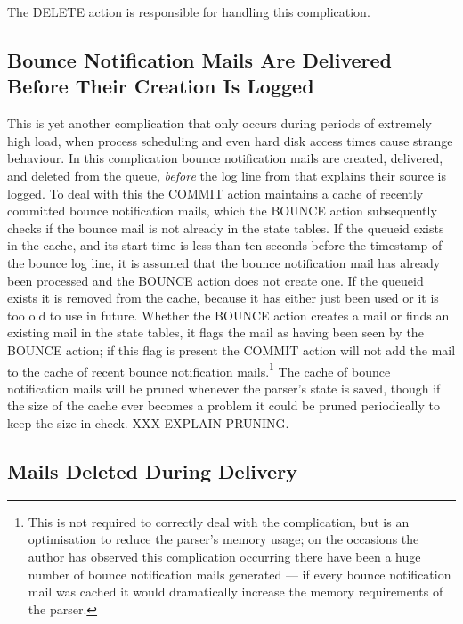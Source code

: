 The DELETE action is responsible for handling this complication.

\subsection{Bounce Notification Mails Are Delivered Before Their Creation
Is Logged}

\label{Bounce notification mails delivered before their creation is logged}

This is yet another complication that only occurs during periods of
extremely high load, when process scheduling and even hard disk access
times cause strange behaviour.  In this complication bounce notification
mails are created, delivered, and deleted from the queue, \textit{before\/}
the log line from  that explains their source is logged.  To
deal with this the COMMIT action maintains a cache of recently committed
bounce notification mails, which the BOUNCE action subsequently checks if
the bounce mail is not already in the state tables. If the queueid exists
in the cache, and its start time is less than ten seconds before the
timestamp of the bounce log line, it is assumed that the bounce
notification mail has already been processed and the BOUNCE action does not
create one.  If the queueid exists it is removed from the cache, because it
has either just been used or it is too old to use in future.  Whether the
BOUNCE action creates a mail or finds an existing mail in the state tables,
it flags the mail as having been seen by the BOUNCE action; if this flag is
present the COMMIT action will not add the mail to the cache of recent
bounce notification mails.\footnote{This is not required to correctly deal
with the complication, but is an optimisation to reduce the parser's memory
usage; on the occasions the author has observed this complication occurring
there have been a huge number of bounce notification mails generated --- if
every bounce notification mail was cached it would dramatically increase
the memory requirements of the parser.}  The cache of bounce notification
mails will be pruned whenever the parser's state is saved, though if the
size of the cache ever becomes a problem it could be pruned periodically to
keep the size in check.  XXX EXPLAIN PRUNING\@.

\subsection{Mails Deleted During Delivery}

